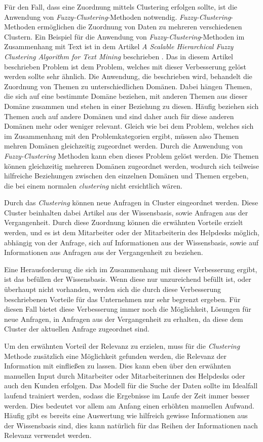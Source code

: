 Für den Fall, dass eine Zuordnung mittels Clustering erfolgen sollte, ist die Anwendung von \textit{Fuzzy-Clustering}-Methoden notwendig. \textit{Fuzzy-Clustering}-Methoden ermöglichen die Zuordnung von Daten zu mehreren verschiedenen Clustern. Ein Beispiel für die Anwendung von \textit{Fuzzy-Clustering}-Methoden im Zusammenhang mit Text ist in dem Artikel \textit{A Scalable Hierarchical Fuzzy Clustering Algorithm for Text Mining} beschrieben \cite{rodrigues2004scalable}. Das in diesem Artikel beschrieben Problem ist dem Problem, welches mit dieser Verbesserung gelöst werden sollte sehr ähnlich. Die Anwendung, die beschrieben wird, behandelt die Zuordnung von Themen zu unterschiedlichen Domänen. Dabei hängen Themen, die sich auf eine bestimmte Domäne beziehen, mit anderen Themen aus dieser Domäne zusammen und stehen in einer Beziehung zu diesen. Häufig beziehen sich Themen auch auf andere Domänen und sind daher auch für diese anderen Domänen mehr oder weniger relevant. Gleich wie bei dem Problem, welches sich im Zusammenhang mit den Problemkategorien ergibt, müssen also Themen mehren Domänen gleichzeitig zugeordnet werden. Durch die Anwendung von \textit{Fuzzy-Clustering} Methoden kann eben dieses Problem gelöst werden. Die Themen können gleichzeitig mehreren Domänen zugeordnet werden, wodurch sich teilweise hilfreiche Beziehungen zwischen den einzelnen Domänen und Themen ergeben, die bei einem normalen \textit{clustering} nicht ersichtlich wären.

Durch das \textit{Clustering} können neue Anfragen in Cluster eingeordnet werden. Diese Cluster beinhalten dabei Artikel aus der Wissensbasis, sowie Anfragen aus der Vergangenheit. Durch diese Zuordnung können die erwähnten Vorteile erzielt werden, und es ist dem Mitarbeiter oder der Mitarbeiterin des Helpdesks möglich, abhängig von der Anfrage, sich auf Informationen aus der Wissensbasis, sowie auf Informationen aus Anfragen aus der Vergangenheit zu beziehen.

Eine Herausforderung die sich im Zusammenhang mit dieser Verbesserung ergibt, ist das befüllen der Wissensbasis. Wenn diese nur unzureichend befüllt ist, oder überhaupt nicht vorhanden, werden sich die durch diese Verbesserung beschriebenen Vorteile für das Unternehmen nur sehr begrenzt ergeben. Für diesen Fall bietet diese Verbesserung immer noch die Möglichkeit, Lösungen für neue Anfragen, in Anfragen aus der Vergangenheit zu erhalten, da diese dem Cluster der aktuellen Anfrage zugeordnet sind.

Um den erwähnten Vorteil der Relevanz zu erzielen, muss für die \textit{Clustering} Methode zusätzlich eine Möglichkeit gefunden werden, die Relevanz der Information mit einfließen zu lassen. Dies kann eben über den erwähnten manuellen Input durch Mitarbeiter oder Mitarbeiterinnen des Helpdesks oder auch den Kunden erfolgen. Das Modell für die Suche der Daten sollte im Idealfall laufend trainiert werden, sodass die Ergebnisse im Laufe der Zeit immer besser werden. Dies bedeutet vor allem am Anfang einen erhöhten manuellen Aufwand. Häufig gibt es bereits eine Auswertung wie hilfreich gewisse Informationen aus der Wissensbasis sind, dies kann natürlich für das Reihen der Informationen nach Relevanz verwendet werden.


